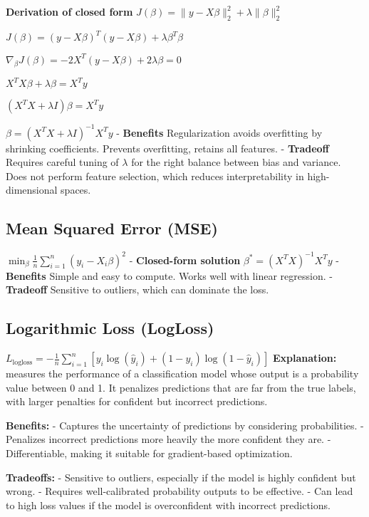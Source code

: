 \documentclass[10pt]{article}
\begin{document}
\begin{multicols}{2}
\textbf{Derivation of closed form}
$
J(\beta) = \|y - X\beta\|_2^2 + \lambda \|\beta\|_2^2
$

$
J(\beta) = (y - X\beta)^T(y - X\beta) + \lambda \beta^T \beta
$

$
\nabla_{\beta} J(\beta) = -2X^T(y - X\beta) + 2\lambda \beta = 0
$

$
X^T X \beta + \lambda \beta = X^T y
$

$
(X^T X + \lambda I) \beta = X^T y
$

$
\beta = (X^T X + \lambda I)^{-1} X^T y
$
- \textbf{Benefits} Regularization avoids overfitting by shrinking coefficients.  Prevents overfitting, retains all features.
- \textbf{Tradeoff} Requires careful tuning of \(\lambda\) for the right balance between bias and variance. Does not perform feature selection, which reduces interpretability in high-dimensional spaces.


\subsection*{Mean Squared Error (MSE)}
$\min_{\beta} \frac{1}{n} \sum_{i=1}^{n} (y_i - X_i\beta)^2$
- \textbf{Closed-form solution} $\beta^* = (X^TX)^{-1}X^Ty$
- \textbf{Benefits} Simple and easy to compute. Works well with linear regression.
- \textbf{Tradeoff} Sensitive to outliers, which can dominate the loss.



\subsection*{Logarithmic Loss (LogLoss)}

$L_{\text{logloss}} = -\frac{1}{n} \sum_{i=1}^{n} \left[ y_i \log(\hat{y}_i) + (1 - y_i) \log(1 - \hat{y}_i) \right]$
\textbf{Explanation:} measures the performance of a classification model whose output is a probability value between 0 and 1. It penalizes predictions that are far from the true labels, with larger penalties for confident but incorrect predictions.

\textbf{Benefits:}
- Captures the uncertainty of predictions by considering probabilities.
- Penalizes incorrect predictions more heavily the more confident they are.
- Differentiable, making it suitable for gradient-based optimization.

\textbf{Tradeoffs:}
- Sensitive to outliers, especially if the model is highly confident but wrong.
- Requires well-calibrated probability outputs to be effective.
- Can lead to high loss values if the model is overconfident with incorrect predictions.



\end{multicols}
\end{document}
